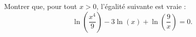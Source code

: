 \medskip

Montrer que, pour tout $x > 0$, l'égalité suivante est vraie :
\[\ln\left(\dfrac{x^4}{9}\right) - 3 \ln(x) + \ln\left(\dfrac{9}{x}\right) = 0.\]
